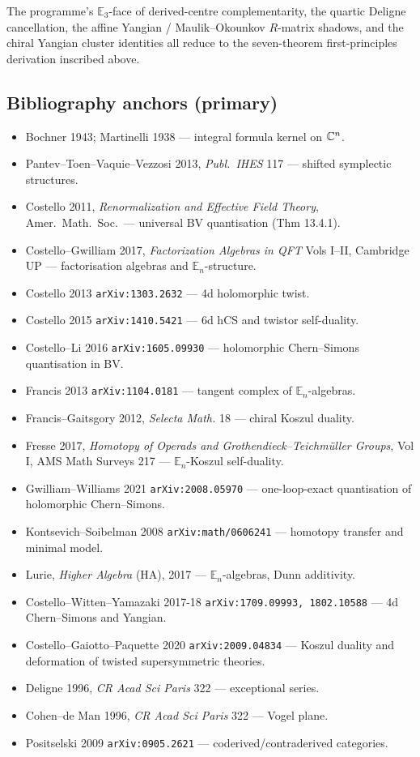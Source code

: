 The programme's $\mathbb E_3$-face of derived-centre complementarity,
the quartic Deligne cancellation, the affine Yangian / Maulik--Okounkov
$R$-matrix shadows, and the chiral Yangian cluster identities all
reduce to the seven-theorem first-principles derivation inscribed
above.


\subsection*{Bibliography anchors (primary)}

\begin{itemize}
\item Bochner 1943; Martinelli 1938 — integral formula kernel on $\mathbb{C}^n$.
\item Pantev--Toen--Vaquie--Vezzosi 2013, \emph{Publ.\ IHES} 117 — shifted
  symplectic structures.
\item Costello 2011, \emph{Renormalization and Effective Field Theory},
  Amer.\ Math.\ Soc.\ — universal BV quantisation (Thm 13.4.1).
\item Costello--Gwilliam 2017, \emph{Factorization Algebras in QFT}
  Vols I--II, Cambridge UP — factorisation algebras and
  $\mathbb E_n$-structure.
\item Costello 2013 \texttt{arXiv:1303.2632} — 4d holomorphic twist.
\item Costello 2015 \texttt{arXiv:1410.5421} — 6d hCS and twistor
  self-duality.
\item Costello--Li 2016 \texttt{arXiv:1605.09930} — holomorphic Chern--Simons
  quantisation in BV.
\item Francis 2013 \texttt{arXiv:1104.0181} — tangent complex of
  $\mathbb E_n$-algebras.
\item Francis--Gaitsgory 2012, \emph{Selecta Math.} 18 — chiral Koszul
  duality.
\item Fresse 2017, \emph{Homotopy of Operads and Grothendieck--Teichmüller
  Groups}, Vol I, AMS Math Surveys 217 — $\mathbb E_n$-Koszul self-duality.
\item Gwilliam--Williams 2021 \texttt{arXiv:2008.05970} — one-loop-exact
  quantisation of holomorphic Chern--Simons.
\item Kontsevich--Soibelman 2008 \texttt{arXiv:math/0606241} —
  homotopy transfer and minimal model.
\item Lurie, \emph{Higher Algebra} (HA), 2017 — $\mathbb E_n$-algebras,
  Dunn additivity.
\item Costello--Witten--Yamazaki 2017-18 \texttt{arXiv:1709.09993,
  1802.10588} — 4d Chern--Simons and Yangian.
\item Costello--Gaiotto--Paquette 2020 \texttt{arXiv:2009.04834} —
  Koszul duality and deformation of twisted supersymmetric theories.
\item Deligne 1996, \emph{CR Acad Sci Paris} 322 — exceptional series.
\item Cohen--de Man 1996, \emph{CR Acad Sci Paris} 322 — Vogel plane.
\item Positselski 2009 \texttt{arXiv:0905.2621} — coderived/contraderived
  categories.
\end{itemize}
